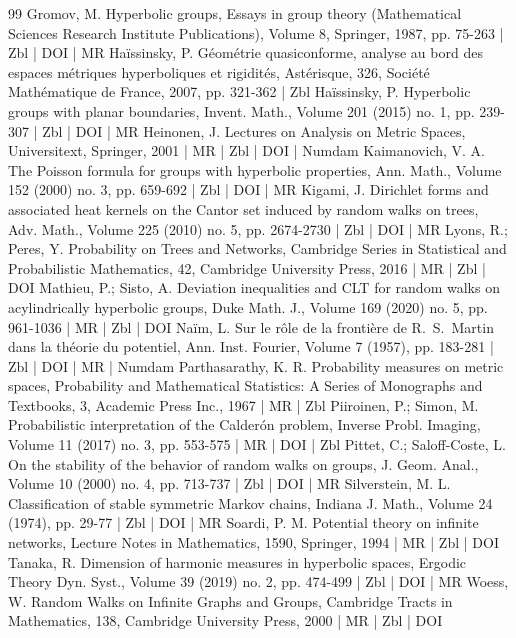 \documentclass[10pt]{amsart}
\theoremstyle{definition}\newtheorem{defi}[theo]{Definition}\newtheorem{rema}[theo]{Remark}\newtheorem{exam}[theo]{Example}\newtheorem{exem}[theo]{Example}\newtheorem{nota}[theo]{Notation}
\begin{document}
\begin{thebibliography}{99}
 Gromov, M. Hyperbolic groups, Essays in group theory (Mathematical Sciences Research Institute Publications), Volume 8, Springer, 1987, pp. 75-263 | Zbl | DOI | MR
 Haïssinsky, P. Géométrie quasiconforme, analyse au bord des espaces métriques hyperboliques et rigidités, Astérisque, 326, Société Mathématique de France, 2007, pp. 321-362 | Zbl
 Haïssinsky, P. Hyperbolic groups with planar boundaries, Invent. Math., Volume 201 (2015) no. 1, pp. 239-307 | Zbl | DOI | MR
 Heinonen, J. Lectures on Analysis on Metric Spaces, Universitext, Springer, 2001 | MR | Zbl | DOI | Numdam
 Kaimanovich, V. A. The Poisson formula for groups with hyperbolic properties, Ann. Math., Volume 152 (2000) no. 3, pp. 659-692 | Zbl | DOI | MR
 Kigami, J. Dirichlet forms and associated heat kernels on the Cantor set induced by random walks on trees, Adv. Math., Volume 225 (2010) no. 5, pp. 2674-2730 | Zbl | DOI | MR
 Lyons, R.; Peres, Y. Probability on Trees and Networks, Cambridge Series in Statistical and Probabilistic Mathematics, 42, Cambridge University Press, 2016 | MR | Zbl | DOI
 Mathieu, P.; Sisto, A. Deviation inequalities and CLT for random walks on acylindrically hyperbolic groups, Duke Math. J., Volume 169 (2020) no. 5, pp. 961-1036 | MR | Zbl | DOI
 Naïm, L. Sur le rôle de la frontière de R. S. Martin dans la théorie du potentiel, Ann. Inst. Fourier, Volume 7 (1957), pp. 183-281 | Zbl | DOI | MR | Numdam
 Parthasarathy, K. R. Probability measures on metric spaces, Probability and Mathematical Statistics: A Series of Monographs and Textbooks, 3, Academic Press Inc., 1967 | MR | Zbl
 Piiroinen, P.; Simon, M. Probabilistic interpretation of the Calderón problem, Inverse Probl. Imaging, Volume 11 (2017) no. 3, pp. 553-575 | MR | DOI | Zbl
 Pittet, C.; Saloff-Coste, L. On the stability of the behavior of random walks on groups, J. Geom. Anal., Volume 10 (2000) no. 4, pp. 713-737 | Zbl | DOI | MR
 Silverstein, M. L. Classification of stable symmetric Markov chains, Indiana J. Math., Volume 24 (1974), pp. 29-77 | Zbl | DOI | MR
 Soardi, P. M. Potential theory on infinite networks, Lecture Notes in Mathematics, 1590, Springer, 1994 | MR | Zbl | DOI
 Tanaka, R. Dimension of harmonic measures in hyperbolic spaces, Ergodic Theory Dyn. Syst., Volume 39 (2019) no. 2, pp. 474-499 | Zbl | DOI | MR
 Woess, W. Random Walks on Infinite Graphs and Groups, Cambridge Tracts in Mathematics, 138, Cambridge University Press, 2000 | MR | Zbl | DOI
\end{thebibliography}
\end{document}
